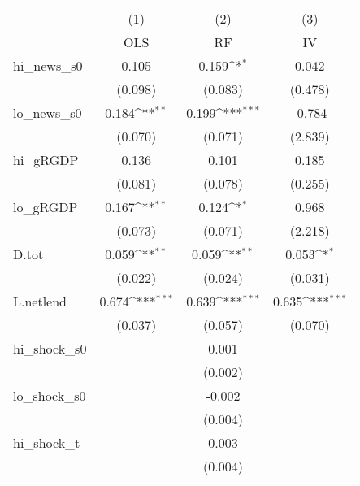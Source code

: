 {
\def\sym#1{\ifmmode^{#1}\else\(^{#1}\)\fi}
\begin{tabular}{l*{3}{c}}
\toprule
            &\multicolumn{1}{c}{(1)}&\multicolumn{1}{c}{(2)}&\multicolumn{1}{c}{(3)}\\
            &\multicolumn{1}{c}{OLS}&\multicolumn{1}{c}{RF}&\multicolumn{1}{c}{IV}\\
\midrule
hi\_news\_s0  &       0.105         &       0.159\sym{*}  &       0.042         \\
            &     (0.098)         &     (0.083)         &     (0.478)         \\
\addlinespace
lo\_news\_s0  &       0.184\sym{**} &       0.199\sym{***}&      -0.784         \\
            &     (0.070)         &     (0.071)         &     (2.839)         \\
\addlinespace
hi\_gRGDP    &       0.136         &       0.101         &       0.185         \\
            &     (0.081)         &     (0.078)         &     (0.255)         \\
\addlinespace
lo\_gRGDP    &       0.167\sym{**} &       0.124\sym{*}  &       0.968         \\
            &     (0.073)         &     (0.071)         &     (2.218)         \\
\addlinespace
D.tot       &       0.059\sym{**} &       0.059\sym{**} &       0.053\sym{*}  \\
            &     (0.022)         &     (0.024)         &     (0.031)         \\
\addlinespace
L.netlend   &       0.674\sym{***}&       0.639\sym{***}&       0.635\sym{***}\\
            &     (0.037)         &     (0.057)         &     (0.070)         \\
\addlinespace
hi\_shock\_s0 &                     &       0.001         &                     \\
            &                     &     (0.002)         &                     \\
\addlinespace
lo\_shock\_s0 &                     &      -0.002         &                     \\
            &                     &     (0.004)         &                     \\
\addlinespace
hi\_shock\_t  &                     &       0.003         &                     \\
            &                     &     (0.004)         &                     \\

\end{tabular}}
